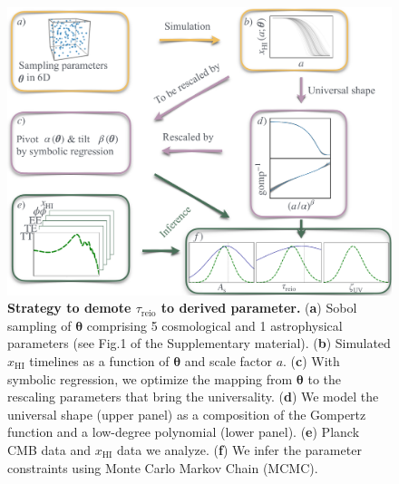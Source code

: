 \documentclass[12pt]{article}
\newcommand{\vtheta}{\boldsymbol{\theta}}
\newcommand{\HI}{\mathrm{HI}}
\newcommand{\reio}{\mathrm{reio}}
\begin{document}
\begin{figure}
\centering
\includegraphics[width=0.9\linewidth]{figs/FIG2.pdf}
\caption{\textbf{\boldmath Strategy to demote $\tau_\reio$ to derived parameter.}
(\textbf{a}) Sobol sampling of $\vtheta$ comprising 5 cosmological and 1
astrophysical parameters (see Fig.1 of the Supplementary material).
(\textbf{b}) Simulated $x_\HI$ timelines as a function of $\vtheta$ and
scale factor $a$.
(\textbf{c}) With symbolic regression, we optimize the mapping from
$\vtheta$ to the rescaling parameters that bring the universality.
(\textbf{d}) We model the universal shape (upper panel) as a composition of
the Gompertz function and a low-degree polynomial (lower panel).
(\textbf{e}) Planck CMB data and $x_\HI$ data we analyze.
(\textbf{f}) We infer the parameter constraints using Monte Carlo Markov
Chain (MCMC).}
\label{fig:big}
\end{figure}
\end{document}
